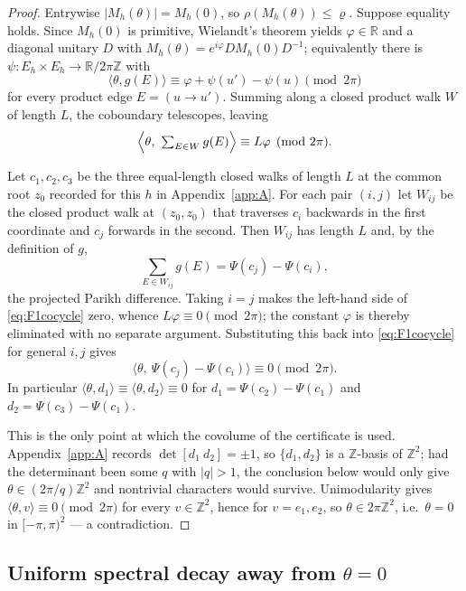 \begin{proof}
Entrywise \(|M_h(\theta)|=M_h(0)\), so \(\rho(M_h(\theta))\le\varrho\).
Suppose equality holds. Since \(M_h(0)\) is primitive, Wielandt's theorem
yields \(\varphi\in\mathbb R\) and a diagonal unitary \(D\) with
\(M_h(\theta)=e^{i\varphi}DM_h(0)D^{-1}\); equivalently there is
\(\psi:E_h\times E_h\to\mathbb R/2\pi\mathbb Z\) with
\[
\langle\theta,g(E)\rangle\equiv\varphi+\psi(u')-\psi(u)\pmod{2\pi}
\]
for every product edge \(E=(u\to u')\). Summing along a closed product walk
\(W\) of length \(L\), the coboundary telescopes, leaving
\begin{equation}\label{eq:F1cocycle}
\Bigl\langle\theta,\ \textstyle\sum_{E\in W}g(E)\Bigr\rangle\equiv L\varphi
\pmod{2\pi}.
\end{equation}

Let \(c_1,c_2,c_3\) be the three equal-length closed walks of length \(L\) at
the common root \(z_0\) recorded for this \(h\) in Appendix~\ref{app:A}. For
each pair \((i,j)\) let \(W_{ij}\) be the closed product walk at
\((z_0,z_0)\) that traverses \(c_i\) backwards in the first coordinate and
\(c_j\) forwards in the second. Then \(W_{ij}\) has length \(L\) and, by the
definition of \(g\),
\[
\sum_{E\in W_{ij}}g(E)=\Psi(c_j)-\Psi(c_i),
\]
the projected Parikh difference. Taking \(i=j\) makes the left-hand side of
\eqref{eq:F1cocycle} zero, whence \(L\varphi\equiv0\pmod{2\pi}\); the constant
\(\varphi\) is thereby eliminated with no separate argument. Substituting this
back into \eqref{eq:F1cocycle} for general \(i,j\) gives
\[
\bigl\langle\theta,\ \Psi(c_j)-\Psi(c_i)\bigr\rangle\equiv0\pmod{2\pi}.
\]
In particular \(\langle\theta,d_1\rangle\equiv\langle\theta,d_2\rangle\equiv0\)
for \(d_1=\Psi(c_2)-\Psi(c_1)\) and \(d_2=\Psi(c_3)-\Psi(c_1)\).

This is the only point at which the covolume of the certificate is used.
Appendix~\ref{app:A} records \(\det[d_1\ d_2]=\pm1\), so \(\{d_1,d_2\}\) is a
\(\mathbb Z\)-basis of \(\mathbb Z^2\); had the determinant been some \(q\)
with \(|q|>1\), the conclusion below would only give
\(\theta\in(2\pi/q)\mathbb Z^2\) and nontrivial characters would survive.
Unimodularity gives \(\langle\theta,v\rangle\equiv0\pmod{2\pi}\) for every
\(v\in\mathbb Z^2\), hence for \(v=e_1,e_2\), so \(\theta\in2\pi\mathbb Z^2\),
i.e.\ \(\theta=0\) in \([-\pi,\pi)^2\) --- a contradiction.
\end{proof}

\subsection{Uniform spectral decay away from \texorpdfstring{\(\theta=0\)}{theta=0}}

